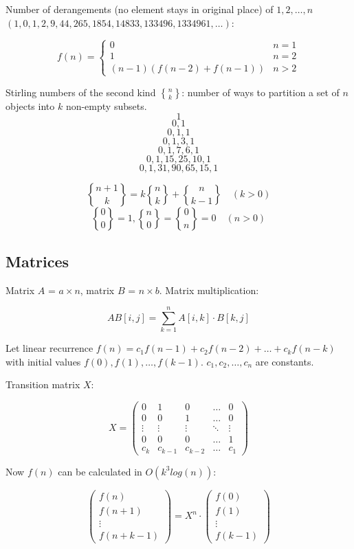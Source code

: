 \documentclass{article}
\DeclareRobustCommand{\stirling}{\genfrac\{\}{0pt}{}} %
\begin{document}
Number of derangements (no element stays in original place) of $1, 2, \dots, n$ $(1, 0, 1, 2, 9, 44, 265, 1854, 14833, 133496, 1334961, \dots)$:

\[
	f(n) =
	\begin{cases}
		0 &n = 1 \\
		1 &n = 2 \\
		(n-1)(f(n-2)+f(n-1)) &n > 2
	\end{cases}
\]

Stirling numbers of the second kind $\stirling{n}{k}$: number of ways to partition a set of $n$ objects into $k$ non-empty subsets.
\[ 1 \] \[ 0, 1 \] \[0, 1, 1 \] \[0, 1, 3, 1 \] \[ 0, 1, 7, 6, 1 \] \[ 0, 1, 15, 25, 10, 1 \] \[ 0, 1, 31, 90, 65, 15, 1 \]

\[ \stirling{n+1}{k} = k\stirling{n}{k}+\stirling{n}{k-1} \quad (k > 0) \] 
\[ \stirling{0}{0} = 1, \stirling{n}{0} = \stirling{0}{n} = 0 \quad (n > 0) \]

\subsection {Matrices}

Matrix $A$ = $a \times n$, matrix $B$ = $n \times b$. Matrix multiplication:

\[ AB[i,j] = \sum_{k=1}^{n} A[i,k] \cdot B[k,j] \]

Let linear recurrence $f(n) = c_1f(n-1) + c_2f(n-2) + \dots + c_kf(n-k)$ with initial values $f(0), f(1), \dots, f(k-1)$. $c_1, c_2, \dots, c_n$ are constants.

Transition matrix $X$:

\[
	X =
	\begin{pmatrix}
		0 & 1 & 0 & \dots & 0 \\
		0 & 0 & 1 & \dots & 0 \\
		\vdots & \vdots & \vdots & \ddots & \vdots \\
		0 & 0 & 0 & \dots & 1 \\
		c_k & c_{k-1} & c_{k-2} & \dots & c_1
	\end{pmatrix}
\]

Now $f(n)$ can be calculated in $O(k^3 log(n))$:

\[
	\begin{pmatrix}
		f(n) \\
		f(n+1) \\
		\vdots \\
		f(n+k-1)
	\end{pmatrix}
	= X^n \cdot
	\begin{pmatrix}
		f(0) \\
		f(1) \\
		\vdots \\
		f(k-1)
	\end{pmatrix}
\]
\end{document}
